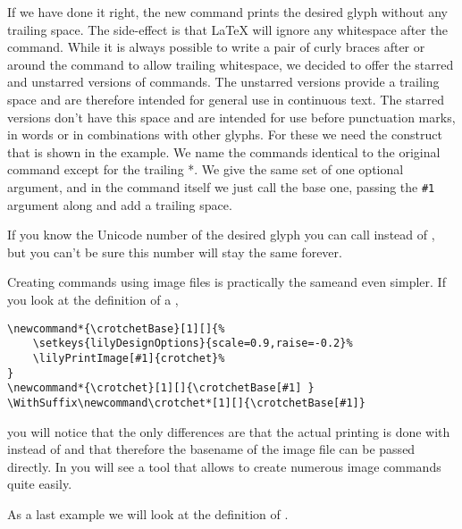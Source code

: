 \documentclass{article}
\begin{document}
\medskip
If we have done it right, the new command prints the desired glyph without any trailing space. 
The side-effect is that \LaTeX{} will ignore any whitespace after the command.
While it is always possible to write a pair of curly braces after or around the command to allow trailing whitespace, we decided to offer the starred and unstarred versions of commands.
The unstarred versions provide a trailing space and are therefore intended for general use in continuous text. 
The starred versions don't have this space and are intended for use before punctuation marks, in words or in combinations with other glyphs.
For these we need the  construct that is shown in the example.
We name the commands identical to the original command except for the trailing *.
We give the same set of one optional argument, and in the command itself we just call the base one, passing the \texttt{\#1} argument along and add a trailing space.

\medskip
If you know the Unicode number of the desired glyph you can call  instead of , but you can't be sure this number will stay the same forever.

\medskip
Creating commands using image files is practically the sameand even simpler.
If you look at the definition of a , 
\begin{verbatim}
\newcommand*{\crotchetBase}[1][]{%
    \setkeys{lilyDesignOptions}{scale=0.9,raise=-0.2}%
    \lilyPrintImage[#1]{crotchet}%
}
\newcommand*{\crotchet}[1][]{\crotchetBase[#1] }
\WithSuffix\newcommand\crotchet*[1][]{\crotchetBase[#1]}
\end{verbatim}
you will notice that the only differences are that the actual printing is done with  instead of  and that therefore the basename of the image file can be passed directly.
In  you will see a tool that allows to create numerous image commands quite easily.

\bigskip
As a last example we will look at the definition of \lilyRFZ {}.
\end{document}
